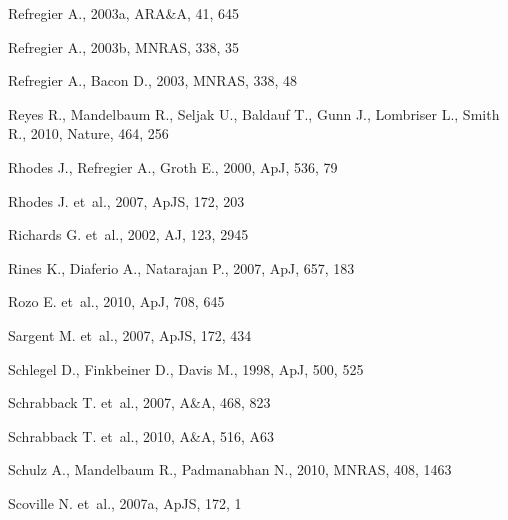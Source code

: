 \documentclass[twocolumn,useAMS,usenatbib]{mn2e}
\makeatletter
\def\reff@jnl#1{{\rm#1\/}}
\def\nat{\reff@jnl{Nature}}             %
\makeatother
\begin{document}
\begin{thebibliography}{}
 {Refregier} A., 2003a, ARA\&A, 41, 645

 {Refregier} A., 2003b, MNRAS, 338, 35

 {Refregier} A., {Bacon} D., 2003, MNRAS, 338, 48

 {Reyes} R., {Mandelbaum} R., {Seljak} U., {Baldauf} T., {Gunn} J., {Lombriser} L., {Smith} R., 2010, \nat, 464, 256

 {Rhodes} J., {Refregier} A., {Groth} E., 2000, ApJ, 536, 79

 {Rhodes} J. et~al., 2007, ApJS, 172, 203

 {Richards} G. et~al., 2002, AJ, 123, 2945

 {Rines} K., {Diaferio} A., {Natarajan} P., 2007, ApJ, 657, 183

 {Rozo} E. et~al., 2010, ApJ, 708, 645

 {Sargent} M. et~al., 2007, ApJS, 172, 434

 {Schlegel} D., {Finkbeiner} D., {Davis} M., 1998, ApJ, 500, 525

 {Schrabback} T. et~al., 2007, A\&A, 468, 823

 {Schrabback} T. et~al., 2010, A\&A, 516, A63

 {Schulz} A., {Mandelbaum} R., {Padmanabhan} N., 2010, MNRAS, 408, 1463

 {Scoville} N. et~al., 2007a, ApJS, 172, 1


\end{thebibliography}
\end{document}
